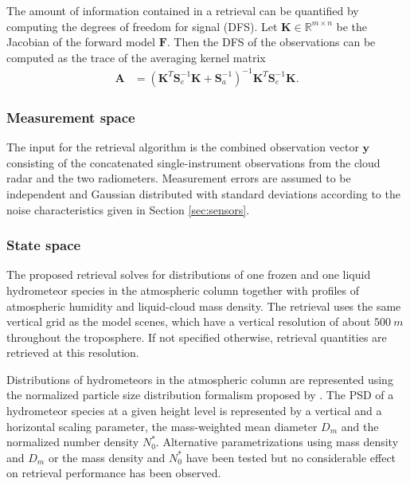 \documentclass[journal abbreviation, manuscript]{copernicus}
\begin{document}
The amount of information contained in a retrieval can be quantified by
computing the degrees of freedom for signal (DFS). Let $\mathbf{K} \in
\mathbb{R}^{m \times n}$ be the Jacobian of the forward model $\mathbf{F}$. Then
the DFS of the observations can be computed as the trace of the averaging kernel
matrix
\begin{align}
  \mathbf{A} &=(\mathbf{K}^T\mathbf{S}_e^{-1}\mathbf{K} + \mathbf{S}_a^{-1})^{-1}
  \mathbf{K}^T\mathbf{S}_e^{-1}\mathbf{K}.
\end{align}

\subsubsection{Measurement space}
\label{sec:orge7dc286}

The input for the retrieval algorithm is the combined observation vector
$\mathbf{y}$ consisting of the concatenated single-instrument observations from
the cloud radar and the two radiometers. Measurement errors are assumed to be
independent and Gaussian distributed with standard deviations according to the
noise characteristics given in Section \ref{sec:sensors}.

\subsubsection{State space}
\label{sec:method:fowardmodel}

The proposed retrieval solves for distributions of one frozen and one liquid
hydrometeor species in the atmospheric column together with profiles of
atmospheric humidity and liquid-cloud mass density. The retrieval uses the same
vertical grid as the model scenes, which have a vertical resolution of about
$500\ \unit{m}$ throughout the troposphere. If not specified otherwise,
retrieval quantities are retrieved at this resolution.

Distributions of hydrometeors in the atmospheric column are represented using
the normalized particle size distribution formalism proposed by
\cite{delanoe05}. The PSD of a hydrometeor species at a given height level is
represented by a vertical and a horizontal scaling parameter, the mass-weighted
mean diameter $D_m$ and the normalized number density $N_0^*$. Alternative 
parametrizations using mass density and $D_m$ or the mass density and $N_0^*$
have been tested but no considerable effect on retrieval performance has been
observed.
\end{document}
